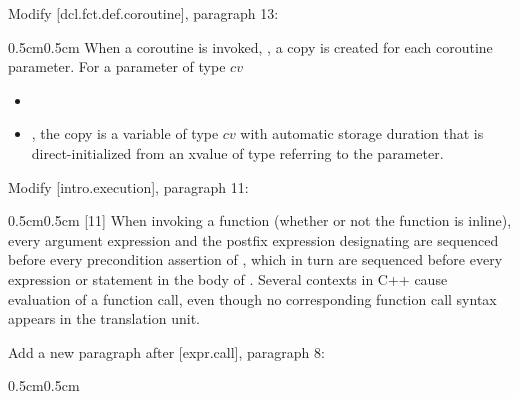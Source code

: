 Modify [dcl.fct.def.coroutine], paragraph 13:
\begin{adjustwidth}{0.5cm}{0.5cm}
When a coroutine is invoked, , a copy is created for each coroutine parameter. For a parameter of type $cv$ \added{:}
\begin{itemize}
\item{}
\item{, the copy is a variable of type $cv$  with automatic storage duration that is direct-initialized from an xvalue of type  referring to the parameter.}
\end{itemize}

\end{adjustwidth}

Modify [intro.execution], paragraph 11:

\begin{adjustwidth}{0.5cm}{0.5cm}
[11]  When invoking a function  (whether or not the function is inline),
every argument expression and the postfix expression designating  are
sequenced before every precondition assertion of , which in turn are sequenced before
every expression or statement in the body of
.
Several contexts in C++ cause evaluation of a function call, even though no
corresponding function call syntax appears in the translation unit.
\end{adjustwidth}

Add a new paragraph after [expr.call], paragraph 8:

\begin{adjustwidth}{0.5cm}{0.5cm}
\end{adjustwidth}

